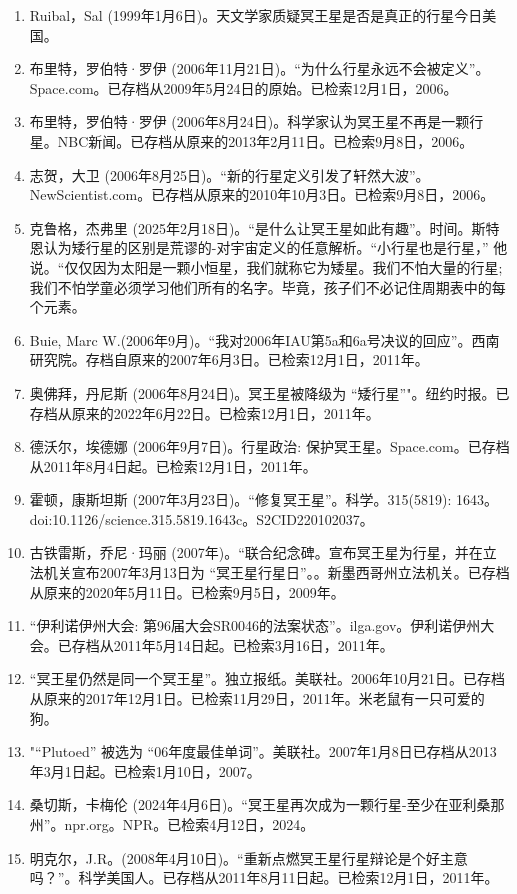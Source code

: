 \begin{enumerate}
\item Ruibal，Sal (1999年1月6日)。天文学家质疑冥王星是否是真正的行星今日美国。
\item 布里特，罗伯特·罗伊 (2006年11月21日)。“为什么行星永远不会被定义”。Space.com。已存档从2009年5月24日的原始。已检索12月1日，2006。
\item 布里特，罗伯特·罗伊 (2006年8月24日)。科学家认为冥王星不再是一颗行星。NBC新闻。已存档从原来的2013年2月11日。已检索9月8日，2006。
\item 志贺，大卫 (2006年8月25日)。“新的行星定义引发了轩然大波”。NewScientist.com。已存档从原来的2010年10月3日。已检索9月8日，2006。
\item 克鲁格，杰弗里 (2025年2月18日)。“是什么让冥王星如此有趣”。时间。斯特恩认为矮行星的区别是荒谬的-对宇宙定义的任意解析。“小行星也是行星，” 他说。“仅仅因为太阳是一颗小恒星，我们就称它为矮星。我们不怕大量的行星; 我们不怕学童必须学习他们所有的名字。毕竟，孩子们不必记住周期表中的每个元素。
\item Buie, Marc W.(2006年9月)。“我对2006年IAU第5a和6a号决议的回应”。西南研究院。存档自原来的2007年6月3日。已检索12月1日，2011年。
\item 奥佛拜，丹尼斯 (2006年8月24日)。冥王星被降级为 “矮行星”"。纽约时报。已存档从原来的2022年6月22日。已检索12月1日，2011年。
\item 德沃尔，埃德娜 (2006年9月7日)。行星政治: 保护冥王星。Space.com。已存档从2011年8月4日起。已检索12月1日，2011年。
\item 霍顿，康斯坦斯 (2007年3月23日)。“修复冥王星”。科学。315(5819): 1643。doi:10.1126/science.315.5819.1643c。S2CID220102037。 
\item 古铁雷斯，乔尼·玛丽 (2007年)。“联合纪念碑。宣布冥王星为行星，并在立法机关宣布2007年3月13日为 “冥王星行星日”。。新墨西哥州立法机关。已存档从原来的2020年5月11日。已检索9月5日，2009年。
\item “伊利诺伊州大会: 第96届大会SR0046的法案状态”。ilga.gov。伊利诺伊州大会。已存档从2011年5月14日起。已检索3月16日，2011年。
\item “冥王星仍然是同一个冥王星”。独立报纸。美联社。2006年10月21日。已存档从原来的2017年12月1日。已检索11月29日，2011年。米老鼠有一只可爱的狗。
\item "“Plutoed” 被选为 “06年度最佳单词”。美联社。2007年1月8日已存档从2013年3月1日起。已检索1月10日，2007。
\item 桑切斯，卡梅伦 (2024年4月6日)。“冥王星再次成为一颗行星-至少在亚利桑那州”。npr.org。NPR。已检索4月12日，2024。
\item 明克尔，J.R。(2008年4月10日)。“重新点燃冥王星行星辩论是个好主意吗？”。科学美国人。已存档从2011年8月11日起。已检索12月1日，2011年。

\end{enumerate}
